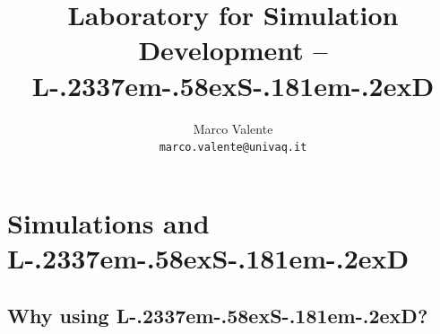 \documentclass [11pt,a4paper] {book}
\def\LsD{{L\kern-.2337em\lower-.58ex\hbox{S}\kern-.181em\lower-.2ex\hbox{D}}\xspace}
\begin{document}
\title{\textbf{Laboratory for Simulation Development -- \LsD }}

\author{Marco Valente\\
{\small \texttt{marco.valente@univaq.it}}
 }

 \maketitle


\newcommand{\BIBand}{{\rm and}}
\newcommand{\compatto}[1] { #1 \vspace {-3pt}}


\newcommand{\menu}[1] {\small\fontfamily{cmss}\textbf{#1}\fontfamily{cmr}\normalsize}
\newcommand{\tech}[1] {\footnote{\textsc{Technical Note}: #1} }
\newcommand{\code}[1] {\texttt{\small #1}}


\newtheorem{Exercise}{Exercise}
\newcommand{\lsd}[1] {\textit{\textbf{#1}}}
{}
\tableofcontents







\chapter{Simulations and \LsD}\label{ch:introduction}
\pagestyle{plain}
 \setcounter{page}{1}

\section{Why using \LsD?}
\end{document}
